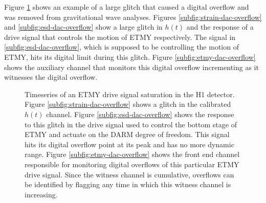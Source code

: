 Figure \ref{fig:dac-overflow} shows an example of a large glitch that caused 
a digital overflow and was removed from gravitational wave analyses. Figures 
\ref{subfig:strain-dac-overflow} and \ref{subfig:esd-dac-overflow} show a 
large glitch in $h(t)$ and the response of a drive signal that controls 
the motion of ETMY respectively. The signal in \ref{subfig:esd-dac-overflow}, 
which is supposed to be controlling the motion of ETMY, hits its digital 
limit during this glitch. Figure \ref{subfig:etmy-dac-overflow} shows the 
auxiliary channel that monitors this digital overflow incrementing as 
it witnesses the digital overflow. 

\begin{figure}[ht!]%
\centering
{}

\caption[ETMY saturation]{Timeseries of an ETMY drive signal saturation in the 
         H1 detector. Figure \ref{subfig:strain-dac-overflow} shows a glitch in 
         the calibrated $h(t)$ channel. Figure \ref{subfig:esd-dac-overflow} shows 
         the response to this glitch in the drive signal used to control the bottom 
         stage of ETMY and actuate on the DARM degree of freedom. This signal hits 
         its digital overflow point at its peak and has no more dynamic range. 
         Figure \ref{subfig:etmy-dac-overflow} shows the front end channel responsible 
         for monitoring digital overflows of this particular ETMY drive signal. 
         Since the witness channel is cumulative, overflows can be identified by 
         flagging any time in which this witness channel is increasing. }
\label{fig:dac-overflow}
\end{figure}

